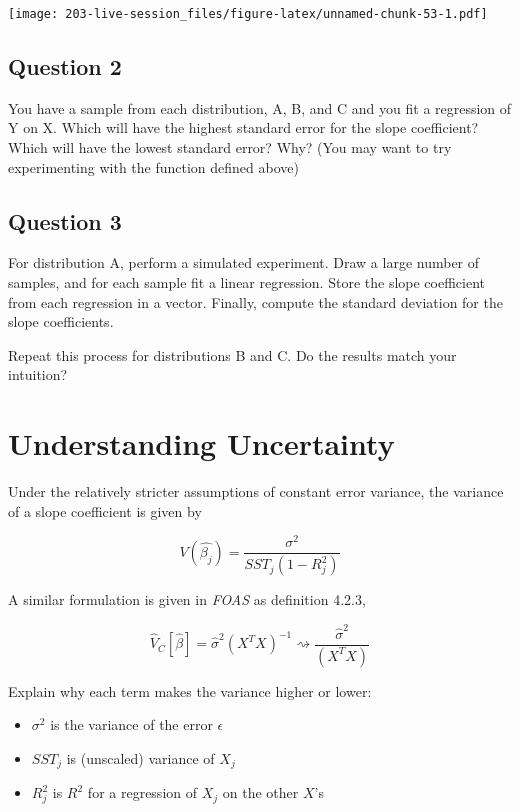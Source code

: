 \documentclass[
]{book}
\providecommand{\tightlist}{%
  \setlength{\itemsep}{0pt}\setlength{\parskip}{0pt}}
\theoremstyle{definition}
\theoremstyle{definition}
\theoremstyle{definition}
\theoremstyle{definition}
\theoremstyle{remark}
\begin{document}
\texttt{[image: 203-live-session\_files/figure-latex/unnamed-chunk-53-1.pdf]}

\hypertarget{question-2}{%
\subsection{Question 2}\label{question-2}}

You have a sample from each distribution, A, B, and C and you fit a regression of Y on X. Which will have the highest standard error for the slope coefficient? Which will have the lowest standard error? Why? (You may want to try experimenting with the function defined above)

\hypertarget{question-3}{%
\subsection{Question 3}\label{question-3}}

For distribution A, perform a simulated experiment. Draw a large number of samples, and for each sample fit a linear regression. Store the slope coefficient from each regression in a vector. Finally, compute the standard deviation for the slope coefficients.

Repeat this process for distributions B and C. Do the results match your intuition?

\hypertarget{understanding-uncertainty-1}{%
\section{Understanding Uncertainty}\label{understanding-uncertainty-1}}

Under the relatively stricter assumptions of constant error variance, the variance of a slope coefficient is given by

\[
  V(\hat{\beta_j}) = \frac{\sigma^2}{SST_j (1-R_j^2)}
\]

A similar formulation is given in \emph{FOAS} as definition 4.2.3,

\[
  \hat{V}_{C}[\hat{\beta}] = \hat{\sigma}^2 \left( X^{T} X \right)^{-1} \rightsquigarrow \frac{\hat{\sigma}^{2}}{\left( X^{T}X\right)}
\]

Explain why each term makes the variance higher or lower:

\begin{itemize}
\tightlist
\item
  \(\sigma^2\) is the variance of the error \(\epsilon\)
\item
  \(SST_j\) is (unscaled) variance of \(X_j\)
\item
  \(R_j^2\) is \(R^2\) for a regression of \(X_j\) on the other \(X\)'s
\end{itemize}
\end{document}

